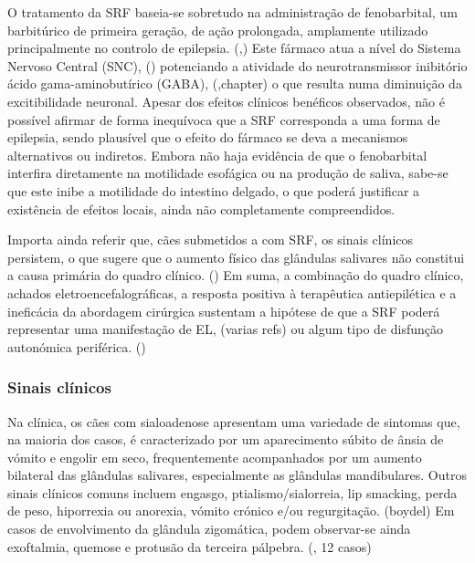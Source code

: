 O tratamento da SRF baseia-se sobretudo na administração de fenobarbital, um barbitúrico de primeira geração, de ação prolongada, amplamente utilizado principalmente no controlo de epilepsia. (\cite{Papich2021},\cite{Scott2021}) Este fármaco atua a nível do Sistema Nervoso Central (SNC), (\cite{Papich2021}) potenciando a atividade do neurotransmissor inibitório ácido gama-aminobutírico (GABA), (\cite{Trinka2023},chapter) o que resulta numa diminuição da excitibilidade neuronal. Apesar dos efeitos clínicos benéficos observados, não é possível afirmar de forma inequívoca que a SRF corresponda a uma forma de epilepsia, sendo plausível que o efeito do fármaco se deva a mecanismos alternativos ou indiretos. \cite{gibbon_phenobarbital-responsive_german_2004} Embora não haja evidência de que o fenobarbital interfira diretamente na motilidade esofágica ou na produção de saliva, sabe-se que este inibe a motilidade do intestino delgado, o que poderá justificar a existência de efeitos locais, ainda não completamente compreendidos. \cite{gibbon_phenobarbital-responsive_german_2004}


Importa ainda referir que, cães submetidos a \cite{Swieton2022} com SRF, os sinais clínicos persistem, o que sugere que o aumento físico das glândulas salivares não constitui a causa primária do quadro clínico. (\cite{Kalayanakoul2019}) 
Em suma, a combinação do quadro clínico, achados eletroencefalográficas, a resposta positiva à terapêutica antiepilética e a ineficácia da abordagem cirúrgica sustentam a hipótese de que a SRF poderá representar uma manifestação de EL, (varias refs) ou algum tipo de disfunção autonómica periférica. (\cite{gibbon_phenobarbital-responsive_german_2004})


\subsubsection{Sinais clínicos} 

Na clínica, os cães com sialoadenose apresentam uma variedade de sintomas que, na maioria dos casos, é caracterizado por um aparecimento súbito de ânsia de vómito e engolir em seco, frequentemente acompanhados por um aumento bilateral das glândulas salivares, especialmente as glândulas mandibulares. \cite{bsava_2020_gastro} Outros sinais clínicos comuns incluem engasgo,  ptialismo/sialorreia, lip smacking, perda de peso, hiporrexia ou anorexia, vómito crónico e/ou regurgitação. (boydel) Em casos de envolvimento da glândula zigomática, podem observar-se ainda exoftalmia, quemose e protusão da terceira pálpebra. (\cite{Park2022}, 12 casos) 



